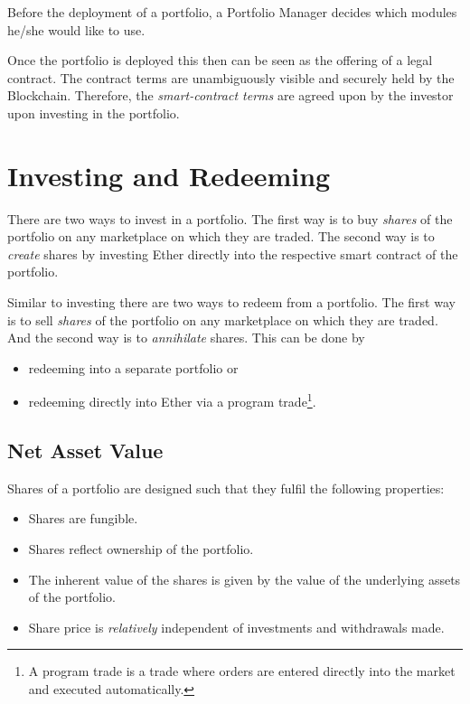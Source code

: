 \documentclass[9pt,oneside]{amsart}
\theoremstyle{plain}
\begin{document}
\begin{multicols}{2}
Before the deployment of a portfolio, a Portfolio Manager decides which modules he/she would like to use.

Once the portfolio is deployed this then can be seen as the offering of a legal contract. The contract terms are unambiguously visible and securely held by the Blockchain. Therefore, the \textit{smart-contract terms} are agreed upon by the investor upon investing in the portfolio.
	
\section{Investing and Redeeming}\label{sec:investing}

There are two ways to invest in a portfolio. The first way is to buy \textit{shares} of the portfolio on any marketplace on which they are traded. The second way is to \textit{create} shares by investing Ether directly into the respective smart contract of the portfolio.

Similar to investing there are two ways to redeem from a portfolio. The first way is to sell \textit{shares} of the portfolio on any marketplace on which they are traded. And the second way is to \textit{annihilate} shares.
This can be done by
\begin{itemize}
	\item redeeming into a separate portfolio or
	\item redeeming directly into Ether via a program trade\footnote{A program trade is a trade where orders are entered directly into the market and executed automatically.}.
\end{itemize}

\subsection{Net Asset Value}\label{sub:defshares}

Shares of a portfolio are designed such that they fulfil the following properties:
\begin{itemize}
	\item Shares are fungible.
	\item Shares reflect ownership of the portfolio.
	\item The inherent value of the shares is given by the value of the underlying assets of the portfolio.
	\item Share price is \textit{relatively} independent of investments and withdrawals made.
\end{itemize}


\end{multicols}
\end{document}
